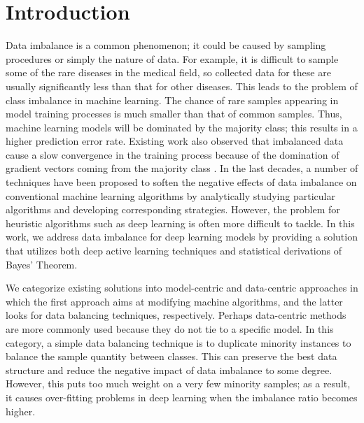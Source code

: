 \documentclass[final,5p,times, twocolumn]{elsarticle}
\begin{document}
	\section{Introduction}
	Data imbalance is a common phenomenon; it could be caused by sampling procedures or simply the nature of data. For example, it is difficult to sample some of the rare diseases in the medical field, so collected data for these are usually significantly less than that for other diseases. This leads to the problem of class imbalance in machine learning. The chance of rare samples appearing in model training processes is much smaller than that of common samples. Thus, machine learning models will be dominated by the majority class; this results in a higher prediction error rate. Existing work also observed that imbalanced data cause a slow convergence in the training process because of the domination of gradient vectors coming from the majority class \cite{ya-guan_emsgd:_2020, liu_high-performance_2020}. In the last decades, a number of techniques have been proposed to soften the negative effects of data imbalance on conventional machine learning algorithms by analytically studying particular algorithms and developing corresponding strategies. However, the problem for heuristic algorithms such as deep learning is often more difficult to tackle. In this work, we address data imbalance for deep learning models by providing a solution that utilizes both deep active learning techniques and statistical derivations of Bayes' Theorem.
	
	We categorize existing solutions into model-centric and data-centric approaches in which the first approach aims at modifying machine algorithms, and the latter looks for data balancing techniques, respectively. Perhaps data-centric methods are more commonly used because they do not tie to a specific model. In this category, a simple data balancing technique is to duplicate minority instances to balance the sample quantity between classes. This can preserve the best data structure and reduce the negative impact of data imbalance to some degree. However, this puts too much weight on a very few minority samples; as a result, it causes over-fitting problems in deep learning when the imbalance ratio becomes higher. 
	
\end{document}
